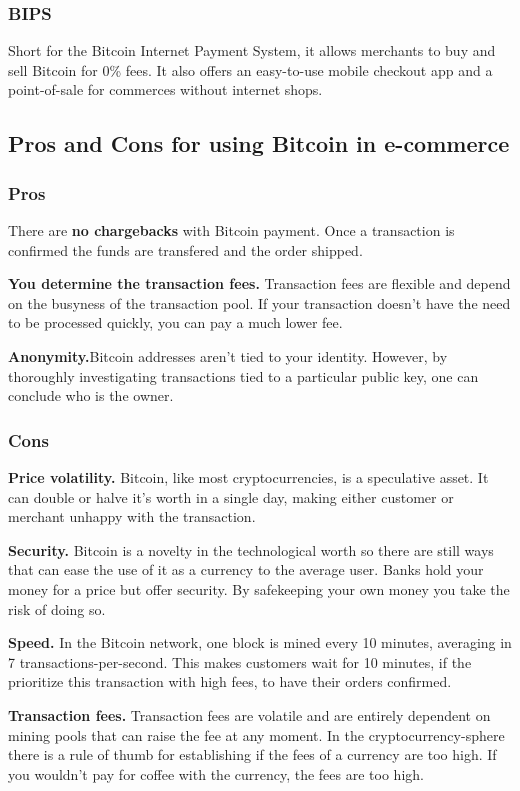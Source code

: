 \documentclass{ferseminar}
\begin{document}
\subsubsection{BIPS}
Short for the Bitcoin Internet Payment System, it allows merchants to buy and sell Bitcoin for 0\% fees. It also offers an easy-to-use mobile checkout app and a point-of-sale for commerces without internet shops.
\subsection{Pros and Cons for using Bitcoin in e-commerce}
\subsubsection{Pros}
There are \textbf{no chargebacks} with Bitcoin payment. Once a transaction is confirmed the funds are transfered and the order shipped.

\textbf{You determine the transaction fees.} Transaction fees are flexible and depend on the busyness of the transaction pool. If your transaction doesn't have the need to be processed quickly, you can pay a much lower fee.

\textbf{Anonymity.}Bitcoin addresses aren't tied to your identity. However, by thoroughly investigating transactions tied to a particular public key, one can conclude who is the owner.

\subsubsection{Cons}
\textbf{Price volatility.} Bitcoin, like most cryptocurrencies, is a speculative asset. It can double or halve it's worth in a single day, making either customer or merchant unhappy with the transaction.

\textbf{Security.} Bitcoin is a novelty in the technological worth so there are still ways that can ease the use of it as a currency to the average user. Banks hold your money for a price but offer security. By safekeeping your own money you take the risk of doing so. 

\textbf{Speed.} In the Bitcoin network, one block is mined every 10 minutes, averaging in 7 transactions-per-second. This makes customers wait for 10 minutes, if the prioritize this transaction with high fees, to have their orders confirmed.

\textbf{Transaction fees.} Transaction fees are volatile and are entirely dependent on mining pools that can raise the fee at any moment. In the cryptocurrency-sphere there is a rule of thumb for establishing if the fees of a currency are too high. If you wouldn't pay for coffee with the currency, the fees are too high.
\end{document}
